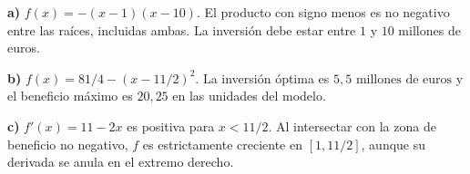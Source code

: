 \textbf{a)} $f(x)=-(x-1)(x-10)$. El producto con signo menos es no negativo entre las raíces, incluidas ambas. La inversión debe estar entre $1$ y $10$ millones de euros.

\textbf{b)} $f(x)=81/4-(x-11/2)^2$. La inversión óptima es $\boxed{5{,}5\text{ millones de euros}}$ y el beneficio máximo es $\boxed{20{,}25}$ en las unidades del modelo.

\textbf{c)} $f'(x)=11-2x$ es positiva para $x<11/2$. Al intersectar con la zona de beneficio no negativo, $f$ es estrictamente creciente en $[1,11/2]$, aunque su derivada se anula en el extremo derecho.
